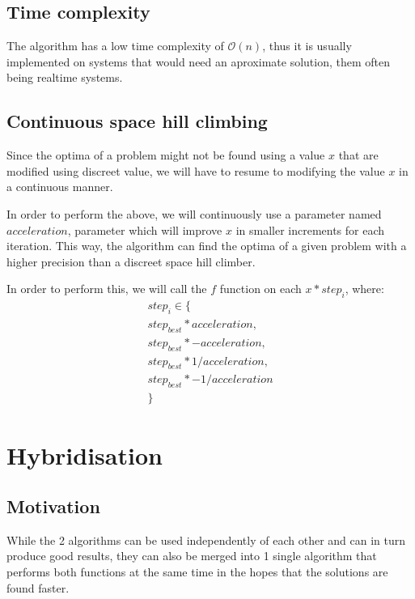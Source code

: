 \documentclass[conference]{IEEEtran}
\begin{document}
\subsection{Time complexity}
The algorithm has a low time complexity of $\mathcal{O}(n)$, thus it is usually implemented on systems that would need an
aproximate solution, them often being realtime systems.

\subsection{Continuous space hill climbing}
Since the optima of a problem might not be found using a value $x$ that are modified using discreet value, we will have to resume
to modifying the value $x$ in a continuous manner.

In order to perform the above, we will continuously use a parameter named $acceleration$, parameter which will improve $x$
in smaller increments for each iteration. This way, the algorithm can find the optima of a given problem with a higher precision
than a discreet space hill climber.

In order to perform this, we will call the $f$ function on each  $x * step_i$, where:
\begin{multline}
    step_i \in \{\\step_{best} * acceleration, \\step_{best} * -acceleration, \\step_{best} * 1 / acceleration, \\step_{best} * -1 / acceleration\\\}
\end{multline}

\section{Hybridisation}

\subsection{Motivation}
While the 2 algorithms can be used independently of each other and can in turn produce good results, they can also be
merged into 1 single algorithm that performs both functions at the same time in the hopes that the solutions are found faster.
\end{document}
